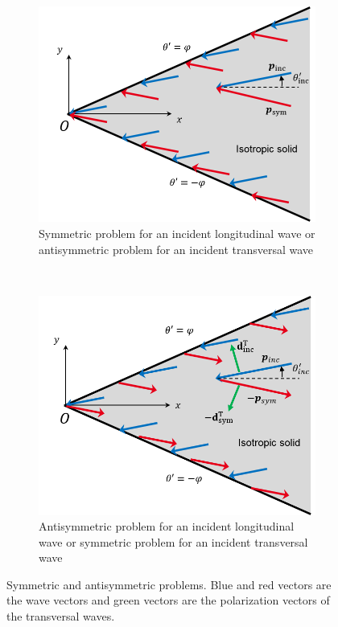 \begin{figure}[h]
    \centering
    \begin{subfigure}[b]{0.45\textwidth}
        \includegraphics[width=\textwidth]{images/chapter1/SymPb.png}
        \caption{Symmetric problem for an incident longitudinal wave or antisymmetric problem for an incident transversal wave}
        \label{Sym}
    \end{subfigure}
    ~ 
    \begin{subfigure}[b]{0.45\textwidth}
        \includegraphics[width=\textwidth]{images/chapter1/AntisymPb.png}
        \caption{Antisymmetric problem for an incident longitudinal wave or symmetric problem for an incident transversal wave}
        \label{Antisym}
    \end{subfigure}
    \caption{Symmetric and antisymmetric problems. Blue and red vectors are the wave vectors and green vectors are the polarization vectors of the transversal waves.}
    \label{SymAntisym}
\end{figure}

